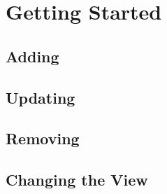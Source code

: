 \section{Getting Started}
\subsection{Adding}
\subsection{Updating}
\subsection{Removing}
\subsection{Changing the View}
